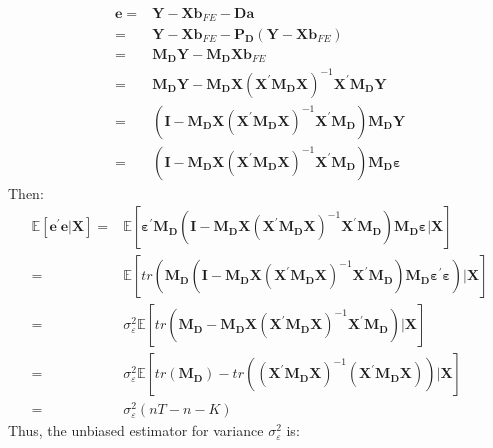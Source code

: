 \documentclass{article}
\begin{document}
	\begin{align*}
		\boldsymbol{e} = &\boldsymbol{Y} - \boldsymbol{X}\boldsymbol{b}_{FE} - \boldsymbol{D} \boldsymbol{a}\\ = &
		\boldsymbol{Y} - \boldsymbol{X}\boldsymbol{b}_{FE} - \boldsymbol{P_D} (\boldsymbol{Y} - \boldsymbol{X} \boldsymbol{b}_{FE})\\ = &
		\boldsymbol{M_D} \boldsymbol{Y} - \boldsymbol{M_D} \boldsymbol{X} \boldsymbol{b}_{FE}\\ = &
		\boldsymbol{M_D} \boldsymbol{Y} - \boldsymbol{M_D} \boldsymbol{X} (\boldsymbol{X}^\prime \boldsymbol{M_D} \boldsymbol{X})^{-1} \boldsymbol{X}^\prime \boldsymbol{M_D} \boldsymbol{Y}\\ = &
		(\boldsymbol{I} - \boldsymbol{M_D} \boldsymbol{X} (\boldsymbol{X}^\prime \boldsymbol{M_D} \boldsymbol{X})^{-1} \boldsymbol{X}^\prime \boldsymbol{M_D}) \boldsymbol{M_D} \boldsymbol{Y}\\ = &
		(\boldsymbol{I} - \boldsymbol{M_D} \boldsymbol{X} (\boldsymbol{X}^\prime \boldsymbol{M_D} \boldsymbol{X})^{-1} \boldsymbol{X}^\prime \boldsymbol{M_D}) \boldsymbol{M_D} \boldsymbol{\varepsilon}
	\end{align*}
Then:
	\begin{align*}
		\mathbb{E} [\boldsymbol{e}^\prime \boldsymbol{e} | \boldsymbol{X}] = & \mathbb{E} [\boldsymbol{\varepsilon}^\prime \boldsymbol{M_D} (\boldsymbol{I} - \boldsymbol{M_D} \boldsymbol{X} (\boldsymbol{X}^\prime \boldsymbol{M_D} \boldsymbol{X})^{-1} \boldsymbol{X}^\prime \boldsymbol{M_D}) \boldsymbol{M_D} \boldsymbol{\varepsilon} | \boldsymbol{X}]\\ = &
		\mathbb{E} [tr(\boldsymbol{M_D}(\boldsymbol{I} - \boldsymbol{M_D} \boldsymbol{X} (\boldsymbol{X}^\prime \boldsymbol{M_D} \boldsymbol{X})^{-1} \boldsymbol{X}^\prime \boldsymbol{M_D}) \boldsymbol{M_D} \boldsymbol{\varepsilon}^\prime \boldsymbol{\varepsilon}) | \boldsymbol{X}]\\ = &
		\sigma^2_{\varepsilon} \mathbb{E} [tr(\boldsymbol{M_D} - \boldsymbol{M_D} \boldsymbol{X} (\boldsymbol{X}^\prime \boldsymbol{M_D} \boldsymbol{X})^{-1} \boldsymbol{X}^\prime \boldsymbol{M_D}) | \boldsymbol{X}]\\ = &
		\sigma^2_{\varepsilon} \mathbb{E}[tr(\boldsymbol{M_D}) - tr((\boldsymbol{X}^\prime \boldsymbol{M_D} \boldsymbol{X})^{-1} (\boldsymbol{X}^\prime \boldsymbol{M_D} \boldsymbol{X})) | \boldsymbol{X}]\\ = &
		\sigma^2_{\varepsilon} (nT - n - K)
	\end{align*}
Thus, the unbiased estimator for variance $\sigma^2_\varepsilon$ is:
\end{document}

